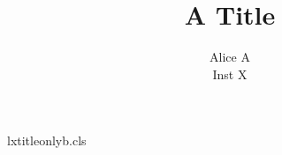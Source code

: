 \begin{filecontents*}[overwrite]{lxtitleonlyb.cls}
\renewcommand\maketitle{\begin{center}{\Large\@title}\end{center}}
\end{filecontents*}
\documentclass{lxtitleonlyb}

\title{A Title}
\author{Alice A\\Inst X}
\makeatletter\g@addto@macro{}\makeatother
\maketitle
Body text.


